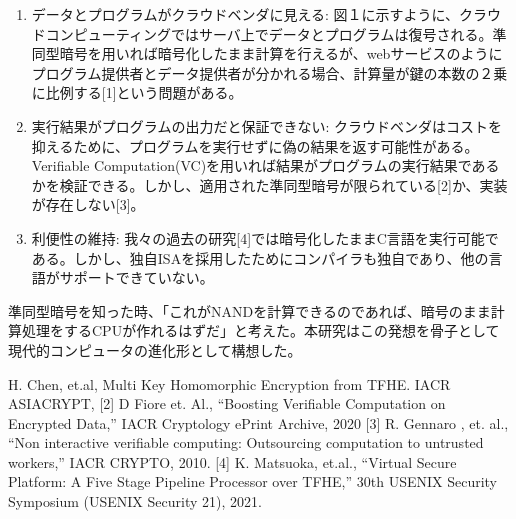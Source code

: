 \begin{enumerate}[leftmargin=0.5cm]
\setlength{\parskip}{0cm} %
\setlength{\itemsep}{0cm} %
    \item データとプログラムがクラウドベンダに見える: 図１に示すように、クラウドコンピューティングではサーバ上でデータとプログラムは復号される。準同型暗号を用いれば暗号化したまま計算を行えるが、webサービスのようにプログラム提供者とデータ提供者が分かれる場合、計算量が鍵の本数の２乗に比例する[1]という問題がある。
    \item 実行結果がプログラムの出力だと保証できない: クラウドベンダはコストを抑えるために、プログラムを実行せずに偽の結果を返す可能性がある。Verifiable Computation(VC)を用いれば結果がプログラムの実行結果であるかを検証できる。しかし、適用された準同型暗号が限られている[2]か、実装が存在しない[3]。
    \item 利便性の維持: 我々の過去の研究[4]では暗号化したままC言語を実行可能である。しかし、独自ISAを採用したためにコンパイラも独自であり、他の言語がサポートできていない。
\end{enumerate}


準同型暗号を知った時、「これがNANDを計算できるのであれば、暗号のまま計算処理をするCPUが作れるはずだ」と考えた。本研究はこの発想を骨子として現代的コンピュータの進化形として構想した。

 H. Chen, et.al, Multi Key Homomorphic Encryption from TFHE. IACR ASIACRYPT, [2] D Fiore et. Al., “Boosting Verifiable Computation on Encrypted Data,” IACR Cryptology ePrint
Archive, 2020 [3] R. Gennaro , et. al., “Non interactive verifiable computing: Outsourcing
computation to untrusted workers,” IACR CRYPTO, 2010. [4] K. Matsuoka, et.al., “Virtual Secure
Platform: A Five Stage Pipeline Processor over TFHE,” 30th USENIX Security Symposium (USENIX Security 21), 2021.



